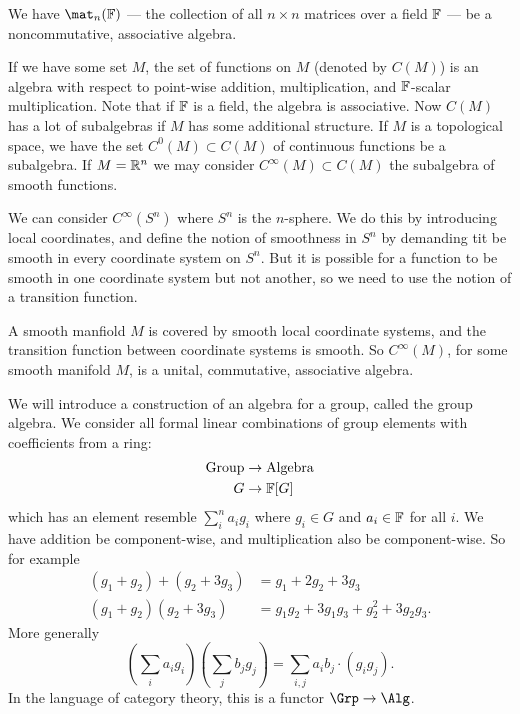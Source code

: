 \begin{ex}
We have $\mat_{n}(\Bbb{F})$ --- the collection of all $n\times n$
matrices over a field $\Bbb{F}$ --- be a noncommutative,
associative algebra.
\end{ex}
\begin{ex}
If we have some set $M$, the set of functions on $M$ (denoted by
$C(M)$) is an algebra with respect to point-wise addition,
multiplication, and $\Bbb{F}$-scalar multiplication. Note that if
$\Bbb{F}$ is a field, the algebra is associative. Now $C(M)$ has
a lot of subalgebras if $M$ has some additional structure. If $M$
is a topological space, we have the set $C^0(M)\subset C(M)$ of
continuous functions be a subalgebra. If $M=\Bbb{R}^{n}$ we may
consider $C^{\infty}(M)\subset C(M)$ the subalgebra of smooth functions.
\end{ex}
\begin{ex}
We can consider $C^{\infty}(S^{n})$ where $S^n$ is the
$n$-sphere. We do this by introducing local coordinates, and
define the notion of smoothness in $S^n$ by demanding tit be
smooth in every coordinate system on $S^n$. But it is possible
for a function to be smooth in one coordinate system but not
another, so we need to use the notion of a transition function.
\end{ex}

A smooth manfiold $M$ is covered by smooth local coordinate
systems, and the transition function between coordinate systems
is smooth. So $C^{\infty}(M)$, for some smooth manifold $M$, is a
unital, commutative, associative algebra.

We will introduce a construction of an algebra for a group,
called the group algebra. We consider all formal linear
combinations of group elements with coefficients from a ring:
\begin{align}
\hbox{Group}&\to\hbox{Algebra}\nonumber\\
G&\to\Bbb{F}[G]
\end{align}
which has an element resemble $\sum_{i}^{n}a_{i}g_{i}$ where
$g_{i}\in G$ and $a_{i}\in\Bbb{F}$ for all $i$. We have addition
be component-wise, and multiplication also be component-wise.
So for example
\begin{subequations}
\begin{align}
(g_{1}+g_{2})+(g_{2}+3g_{3}) &= g_{1}+2g_{2}+3g_{3}\\
(g_{1}+g_{2})(g_{2}+3g_{3}) &= g_{1}g_{2}+3g_{1}g_{3}+g_{2}^{2}+3g_{2}g_{3}.
\end{align}
\end{subequations}
More generally
\begin{equation}
(\sum_{i}a_{i}g_{i})(\sum_{j}b_{j}g_{j})=\sum_{i,j}a_{i}b_{j}\cdot(g_{i}g_{j}).
\end{equation}
In the language of category theory, this is a functor $\Grp\to\Alg$.

